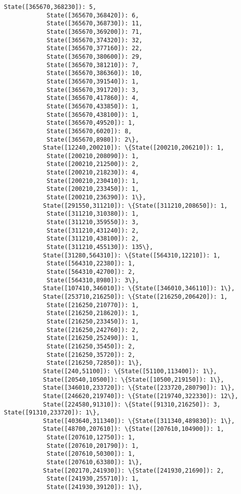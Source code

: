 \documentclass[11pt]{article}
\begin{document}
\begin{Verbatim}[commandchars=\\\{\}]
            State([365670,368230]): 5,
            State([365670,368420]): 6,
            State([365670,368730]): 11,
            State([365670,369200]): 71,
            State([365670,374320]): 32,
            State([365670,377160]): 22,
            State([365670,380600]): 29,
            State([365670,381210]): 7,
            State([365670,386360]): 10,
            State([365670,391540]): 1,
            State([365670,391720]): 3,
            State([365670,417860]): 4,
            State([365670,433850]): 1,
            State([365670,438100]): 1,
            State([365670,49520]): 1,
            State([365670,6020]): 8,
            State([365670,8980]): 2\},
           State([12240,200210]): \{State([200210,206210]): 1,
            State([200210,208090]): 1,
            State([200210,212500]): 2,
            State([200210,218230]): 4,
            State([200210,230410]): 1,
            State([200210,233450]): 1,
            State([200210,236390]): 1\},
           State([291550,311210]): \{State([311210,208650]): 1,
            State([311210,310380]): 1,
            State([311210,359550]): 3,
            State([311210,431240]): 2,
            State([311210,438100]): 2,
            State([311210,455130]): 135\},
           State([31280,564310]): \{State([564310,12210]): 1,
            State([564310,22380]): 1,
            State([564310,42700]): 2,
            State([564310,8980]): 3\},
           State([107410,346010]): \{State([346010,346110]): 1\},
           State([253710,216250]): \{State([216250,206420]): 1,
            State([216250,210770]): 1,
            State([216250,218620]): 1,
            State([216250,233450]): 1,
            State([216250,242760]): 2,
            State([216250,252490]): 1,
            State([216250,35450]): 2,
            State([216250,35720]): 2,
            State([216250,72850]): 1\},
           State([240,51100]): \{State([51100,113400]): 1\},
           State([20540,10500]): \{State([10500,219150]): 1\},
           State([346010,233720]): \{State([233720,280790]): 1\},
           State([246620,219740]): \{State([219740,322330]): 12\},
           State([224580,91310]): \{State([91310,216250]): 3, State([91310,233720]): 1\},
           State([403640,311340]): \{State([311340,489830]): 1\},
           State([48700,207610]): \{State([207610,104900]): 1,
            State([207610,12750]): 1,
            State([207610,201790]): 1,
            State([207610,50300]): 1,
            State([207610,63380]): 1\},
           State([202170,241930]): \{State([241930,21690]): 2,
            State([241930,255710]): 1,
            State([241930,39120]): 1\},

\end{Verbatim}
\end{document}
